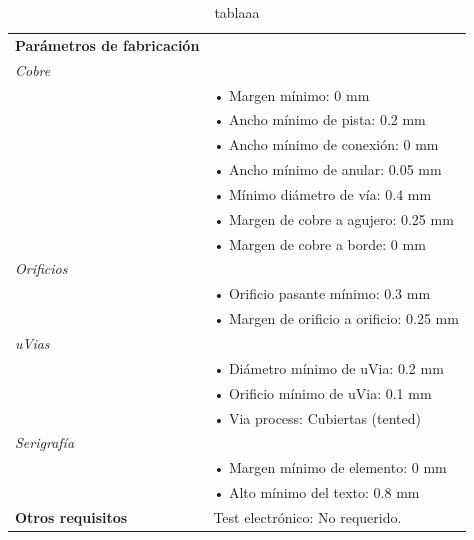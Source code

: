 \documentclass{reporti}
\begin{document}
\begin{table}[H]
\begin{tabularx}{\textwidth}{lX}
    \textbf{Parámetros de fabricación} & \\
    \multicolumn{2}{l}{\textit{Cobre}} \\
    & \quad • Margen mínimo: 0 mm \\
    & \quad • Ancho mínimo de pista: 0.2 mm \\
    & \quad • Ancho mínimo de conexión: 0 mm \\
    & \quad • Ancho mínimo de anular: 0.05 mm \\
    & \quad • Mínimo diámetro de vía: 0.4 mm \\
    & \quad • Margen de cobre a agujero: 0.25 mm \\
    & \quad • Margen de cobre a borde: 0 mm \\
    \multicolumn{2}{l}{\textit{Orificios}} \\
    & \quad • Orificio pasante mínimo: 0.3 mm \\
    & \quad • Margen de orificio a orificio: 0.25 mm \\
    \multicolumn{2}{l}{\textit{uVias}} \\
    & \quad • Diámetro mínimo de uVia: 0.2 mm \\
    & \quad • Orificio mínimo de uVia: 0.1 mm \\
    & \quad • Via process: Cubiertas (tented) \\
    \multicolumn{2}{l}{\textit{Serigrafía}} \\
    & \quad • Margen mínimo de elemento: 0 mm \\
    & \quad • Alto mínimo del texto: 0.8 mm \\
    \cmidrule(lr){1-2}

    \textbf{Otros requisitos} 
    & Test electrónico: No requerido. \\
    \bottomrule
  \end{tabularx}
  \caption{tablaaa}
\end{table}
\end{document}
